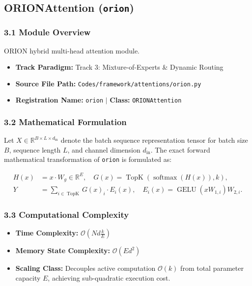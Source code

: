 \subsection{ORIONAttention (\texttt{orion})}
\label{sec:app_module_orion}

\subsubsection*{3.1 Module Overview}
ORION hybrid multi-head attention module.
\begin{itemize}
    \item \textbf{Track Paradigm:} Track 3: Mixture-of-Experts \& Dynamic Routing
    \item \textbf{Source File Path:} \texttt{Codes/framework/attentions/orion.py}
    \item \textbf{Registration Name:} \texttt{orion} $\mid$ \textbf{Class:} \texttt{ORIONAttention}
\end{itemize}

\subsubsection*{3.2 Mathematical Formulation}
Let $X \in \mathbb{R}^{B \times L \times d_{\text{in}}}$ denote the batch sequence representation tensor for batch size $B$, sequence length $L$, and channel dimension $d_{\text{in}}$. The exact forward mathematical transformation of \texttt{orion} is formulated as:

\begin{align}
H(x) &= x \cdot W_g \in \mathbb{R}^{E}, \quad G(x) = \operatorname{TopK}\left(\operatorname{softmax}(H(x)), k\right), \\
Y &= \sum_{i \in \operatorname{TopK}} G(x)_i \cdot E_i(x), \quad E_i(x) = \operatorname{GELU}(x W_{1, i}) W_{2, i}.
\end{align}


\subsubsection*{3.3 Computational Complexity}
\begin{itemize}
    \item \textbf{Time Complexity:} $\mathcal{O}(N d \frac{k}{E})$
    \item \textbf{Memory State Complexity:} $\mathcal{O}(E d^2)$
    \item \textbf{Scaling Class:} Decouples active computation $\mathcal{O}(k)$ from total parameter capacity $E$, achieving sub-quadratic execution cost.
\end{itemize}

